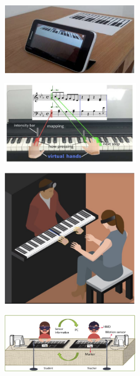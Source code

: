 \documentclass[manuscript,screen]{acmart}
\begin{document}
\begin{figure}
    \centering
    \includegraphics[width=7cm]{figures/zaqoutfingerpiano.png}
    \caption{\cite{zaqout2015augmented} }
    \label{fig:zaqoutfingerpiano}
\end{figure}

\begin{figure}
    \centering
    \includegraphics[width=7cm]{figures/caipiano.png}
    \caption{\cite{cai2019designa} }
    \label{fig:caipiano}
\end{figure}


\begin{figure}
    \centering
    \includegraphics[width=7cm]{figures/gerryadept.png}
    \caption{\cite{gerry2019adept} }
    \label{fig:gerryadept}
\end{figure}

\begin{figure}
    \centering
    \includegraphics[width=7cm]{figures/caigroup.png}
    \caption{\cite{cai2019designb} }
    \label{fig:caigroup}
\end{figure}
\end{document}

